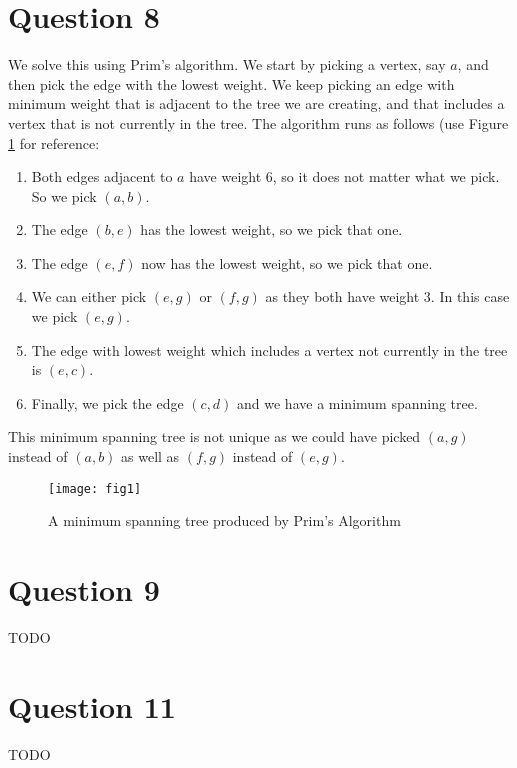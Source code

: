 \documentclass[a4paper, fleqn]{article}
\begin{document}
\section*{Question 8}
We solve this using Prim's algorithm. We start by picking a vertex, say $a$, and then pick the edge with the lowest weight. We keep picking an edge with minimum weight that is adjacent to the tree we are creating, and that includes a vertex that is not currently in the tree. The algorithm runs as follows (use Figure \ref{fig1} for reference:
\begin{enumerate}
  \item Both edges adjacent to $a$ have weight $6$, so it does not matter what we pick. So we pick $(a,b)$.
  \item The edge $(b,e)$ has the lowest weight, so we pick that one.
  \item The edge $(e,f)$ now has the lowest weight, so we pick that one.
  \item We can either pick $(e,g)$ or $(f,g)$ as they both have weight $3$. In this case we pick $(e,g)$.
  \item The edge with lowest weight which includes a vertex not currently in the tree is $(e,c)$.
  \item Finally, we pick the edge $(c,d)$ and we have a minimum spanning tree.
\end{enumerate}
This minimum spanning tree is not unique as we could have picked $(a,g)$ instead of $(a,b)$ as well as $(f,g)$ instead of $(e,g)$.
\begin{figure}[H]
  \centering
  \texttt{[image: fig1]}
  \caption{A minimum spanning tree produced by Prim's Algorithm}
  \label{fig1}
\end{figure}

\section*{Question 9}
TODO

\section*{Question 11}
TODO
\end{document}

